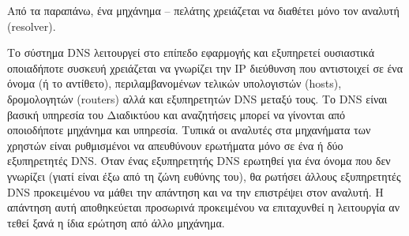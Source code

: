 Από τα παραπάνω, ένα μηχάνημα -- πελάτης χρειάζεται να διαθέτει μόνο τον αναλυτή (resolver).

Το σύστημα DNS λειτουργεί στο επίπεδο εφαρμογής και εξυπηρετεί ουσιαστικά οποιαδήποτε συσκευή χρειάζεται να γνωρίζει την IP διεύθυνση που αντιστοιχεί σε ένα όνομα (ή το αντίθετο), περιλαμβανομένων τελικών υπολογιστών (hosts), δρομολογητών (routers) αλλά και εξυπηρετητών DNS
μεταξύ τους. Το DNS είναι βασική υπηρεσία του Διαδικτύου και αναζητήσεις μπορεί να γίνονται από οποιοδήποτε μηχάνημα και υπηρεσία. Τυπικά οι αναλυτές στα μηχανήματα των χρηστών είναι ρυθμισμένοι να απευθύνουν ερωτήματα μόνο σε ένα ή δύο εξυπηρετητές DNS. Όταν ένας εξυπηρετητής DNS ερωτηθεί για ένα όνομα που δεν γνωρίζει (γιατί είναι έξω από τη ζώνη ευθύνης του), θα ρωτήσει άλλους εξυπηρετητές DNS προκειμένου να μάθει την απάντηση και να την επιστρέψει στον αναλυτή. Η απάντηση αυτή αποθηκεύεται προσωρινά προκειμένου να επιταχυνθεί η λειτουργία αν τεθεί ξανά η ίδια ερώτηση από άλλο μηχάνημα.